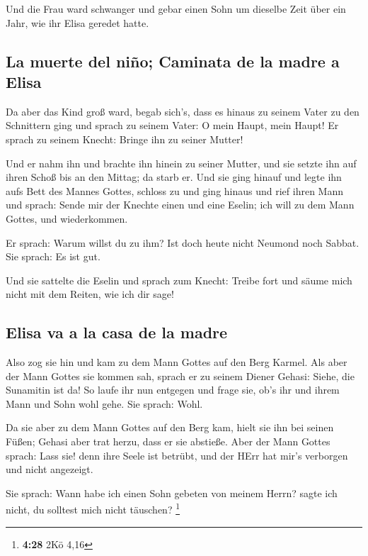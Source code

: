  Und die Frau ward schwanger und gebar einen Sohn um
dieselbe Zeit über ein Jahr, wie ihr Elisa geredet hatte.

\hypertarget{la-muerte-del-niuxf1o-caminata-de-la-madre-a-elisa}{%
\subsection{La muerte del niño; Caminata de la madre a
Elisa}\label{la-muerte-del-niuxf1o-caminata-de-la-madre-a-elisa}}

 Da aber das Kind groß ward, begab sich's, dass es hinaus
zu seinem Vater zu den Schnittern ging  und sprach zu
seinem Vater: O mein Haupt, mein Haupt! Er sprach zu seinem Knecht:
Bringe ihn zu seiner Mutter!

 Und er nahm ihn und brachte ihn hinein zu seiner Mutter,
und sie setzte ihn auf ihren Schoß bis an den Mittag; da starb er.
 Und sie ging hinauf und legte ihn aufs Bett des Mannes
Gottes, schloss zu und ging hinaus  und rief ihren Mann
und sprach: Sende mir der Knechte einen und eine Eselin; ich will zu dem
Mann Gottes, und wiederkommen.

 Er sprach: Warum willst du zu ihm? Ist doch heute nicht
Neumond noch Sabbat. Sie sprach: Es ist gut.

 Und sie sattelte die Eselin und sprach zum Knecht:
Treibe fort und säume mich nicht mit dem Reiten, wie ich dir sage!

\hypertarget{elisa-va-a-la-casa-de-la-madre}{%
\subsection{Elisa va a la casa de la
madre}\label{elisa-va-a-la-casa-de-la-madre}}

 Also zog sie hin und kam zu dem Mann Gottes auf den Berg
Karmel. Als aber der Mann Gottes sie kommen sah, sprach er zu seinem
Diener Gehasi: Siehe, die Sunamitin ist da!  So laufe ihr
nun entgegen und frage sie, ob's ihr und ihrem Mann und Sohn wohl gehe.
Sie sprach: Wohl.

 Da sie aber zu dem Mann Gottes auf den Berg kam, hielt
sie ihn bei seinen Füßen; Gehasi aber trat herzu, dass er sie abstieße.
Aber der Mann Gottes sprach: Lass sie! denn ihre Seele ist betrübt, und
der HErr hat mir's verborgen und nicht angezeigt.

 Sie sprach: Wann habe ich einen Sohn gebeten von meinem
Herrn? sagte ich nicht, du solltest mich nicht täuschen? \footnote{\textbf{4:28}
  2Kö 4,16}

